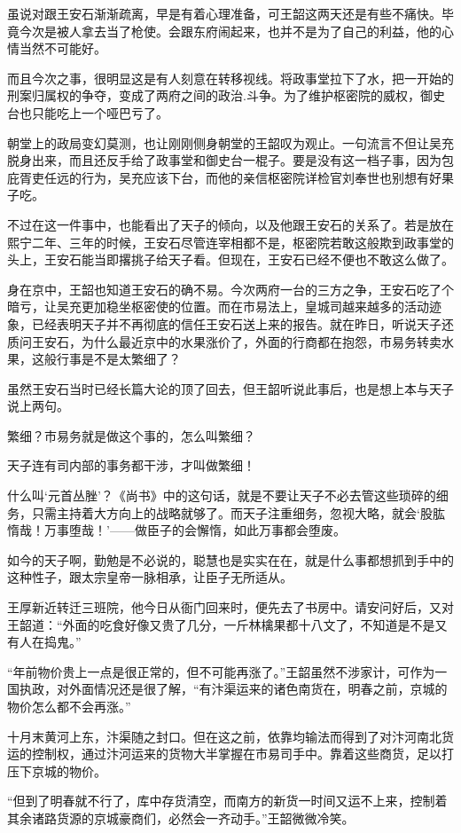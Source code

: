 虽说对跟王安石渐渐疏离，早是有着心理准备，可王韶这两天还是有些不痛快。毕竟今次是被人拿去当了枪使。会跟东府闹起来，也并不是为了自己的利益，他的心情当然不可能好。

而且今次之事，很明显这是有人刻意在转移视线。将政事堂拉下了水，把一开始的刑案归属权的争夺，变成了两府之间的政治.斗争。为了维护枢密院的威权，御史台也只能吃上一个哑巴亏了。

朝堂上的政局变幻莫测，也让刚刚侧身朝堂的王韶叹为观止。一句流言不但让吴充脱身出来，而且还反手给了政事堂和御史台一棍子。要是没有这一档子事，因为包庇胥吏任远的行为，吴充应该下台，而他的亲信枢密院详检官刘奉世也别想有好果子吃。

不过在这一件事中，也能看出了天子的倾向，以及他跟王安石的关系了。若是放在熙宁二年、三年的时候，王安石尽管连宰相都不是，枢密院若敢这般欺到政事堂的头上，王安石能当即撂挑子给天子看。但现在，王安石已经不便也不敢这么做了。

身在京中，王韶也知道王安石的确不易。今次两府一台的三方之争，王安石吃了个暗亏，让吴充更加稳坐枢密使的位置。而在市易法上，皇城司越来越多的活动迹象，已经表明天子并不再彻底的信任王安石送上来的报告。就在昨日，听说天子还质问王安石，为什么最近京中的水果涨价了，外面的行商都在抱怨，市易务转卖水果，这般行事是不是太繁细了？

虽然王安石当时已经长篇大论的顶了回去，但王韶听说此事后，也是想上本与天子说上两句。

繁细？市易务就是做这个事的，怎么叫繁细？

天子连有司内部的事务都干涉，才叫做繁细！

什么叫‘元首丛脞’？《尚书》中的这句话，就是不要让天子不必去管这些琐碎的细务，只需主持着大方向上的战略就够了。而天子注重细务，忽视大略，就会‘股肱惰哉！万事堕哉！’——做臣子的会懈惰，如此万事都会堕废。

如今的天子啊，勤勉是不必说的，聪慧也是实实在在，就是什么事都想抓到手中的这种性子，跟太宗皇帝一脉相承，让臣子无所适从。

王厚新近转迁三班院，他今日从衙门回来时，便先去了书房中。请安问好后，又对王韶道：“外面的吃食好像又贵了几分，一斤林檎果都十八文了，不知道是不是又有人在捣鬼。”

“年前物价贵上一点是很正常的，但不可能再涨了。”王韶虽然不涉家计，可作为一国执政，对外面情况还是很了解，“有汴渠运来的诸色南货在，明春之前，京城的物价怎么都不会再涨。”

十月末黄河上东，汴渠随之封口。但在这之前，依靠均输法而得到了对汴河南北货运的控制权，通过汴河运来的货物大半掌握在市易司手中。靠着这些商货，足以打压下京城的物价。

“但到了明春就不行了，库中存货清空，而南方的新货一时间又运不上来，控制着其余诸路货源的京城豪商们，必然会一齐动手。”王韶微微冷笑。

